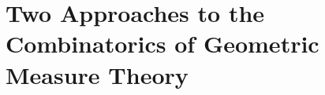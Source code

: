 
\section{Two Approaches to the Combinatorics of Geometric Measure Theory} \label{section:Effective_versions_of_Combinatorial_Proofs}

